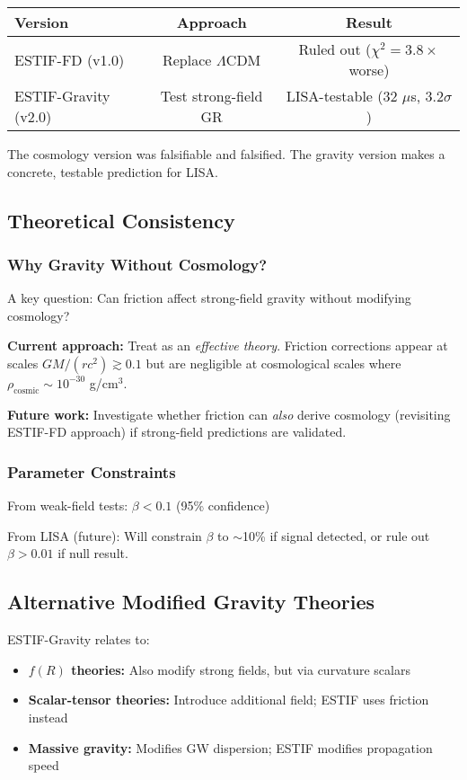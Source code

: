\documentclass[12pt]{article}
\begin{document}
\begin{center}
\begin{tabular}{lcc}
\hline
Version & Approach & Result \\
\hline
ESTIF-FD (v1.0) & Replace $\Lambda$CDM & Ruled out ($\chi^2 = 3.8\times$ worse) \\
ESTIF-Gravity (v2.0) & Test strong-field GR & LISA-testable (32 $\mu$s, 3.2$\sigma$) \\
\hline
\end{tabular}
\end{center}

The cosmology version was falsifiable and falsified. The gravity version makes a concrete, testable prediction for LISA.

\subsection{Theoretical Consistency}

\subsubsection{Why Gravity Without Cosmology?}

A key question: Can friction affect strong-field gravity without modifying cosmology?

\textbf{Current approach:} Treat as an \emph{effective theory}. Friction corrections appear at scales $GM/(rc^2) \gtrsim 0.1$ but are negligible at cosmological scales where $\rho_{\text{cosmic}} \sim 10^{-30}$ g/cm$^3$.

\textbf{Future work:} Investigate whether friction can \emph{also} derive cosmology (revisiting ESTIF-FD approach) if strong-field predictions are validated.

\subsubsection{Parameter Constraints}

From weak-field tests: $\beta < 0.1$ (95\% confidence)

From LISA (future): Will constrain $\beta$ to $\sim$10\% if signal detected, or rule out $\beta > 0.01$ if null result.

\subsection{Alternative Modified Gravity Theories}

ESTIF-Gravity relates to:
\begin{itemize}
    \item \textbf{$f(R)$ theories:} Also modify strong fields, but via curvature scalars
    \item \textbf{Scalar-tensor theories:} Introduce additional field; ESTIF uses friction instead
    \item \textbf{Massive gravity:} Modifies GW dispersion; ESTIF modifies propagation speed
\end{itemize}
\end{document}
